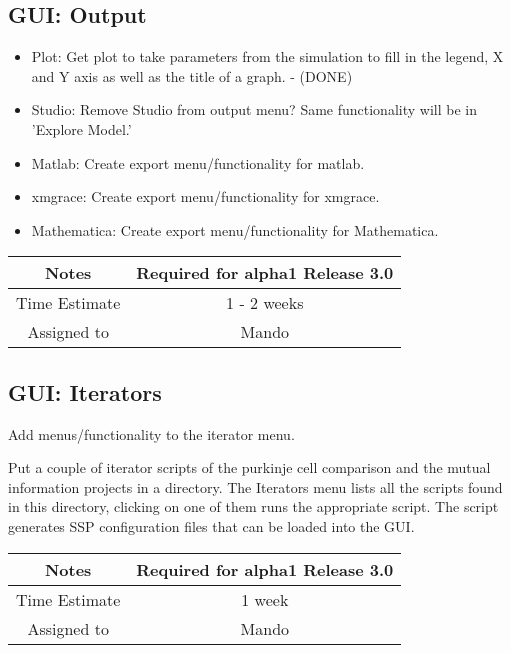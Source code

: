 \documentclass[12pt]{article}
\begin{document}
\subsection{GUI: Output}
\begin{itemize}
\item Plot: Get plot to take parameters from the simulation to fill in
  the legend, X and Y axis as well as the title of a graph. - (DONE)
\item Studio: Remove Studio from output menu? Same functionality will
  be in 'Explore Model.'
\item Matlab: Create export menu/functionality for matlab.
\item xmgrace: Create export menu/functionality for xmgrace.
\item Mathematica: Create export menu/functionality for Mathematica.
\end{itemize}

{
  \vspace{5mm}
  \centering
  \begin{tabular}{|c|c|}
    \hline
    Notes
    & Required for alpha1 Release 3.0 \\
    \hline
    Time Estimate
    & 1 - 2 weeks \\
    \hline
    Assigned to
    & Mando \\
    \hline
  \end{tabular}
}


\subsection{GUI: Iterators}
Add menus/functionality to the iterator menu.

Put a couple of iterator scripts of the purkinje cell comparison and
the mutual information projects in a directory.  The Iterators menu
lists all the scripts found in this directory, clicking on one of them
runs the appropriate script.  The script generates SSP configuration
files that can be loaded into the GUI.

{
  \vspace{5mm}
  \centering
  \begin{tabular}{|c|c|}
    \hline
    Notes
    & Required for alpha1 Release 3.0 \\
    \hline
    Time Estimate
    & 1 week \\
    \hline
    Assigned to
    & Mando \\
    \hline
  \end{tabular}
}
\end{document}

